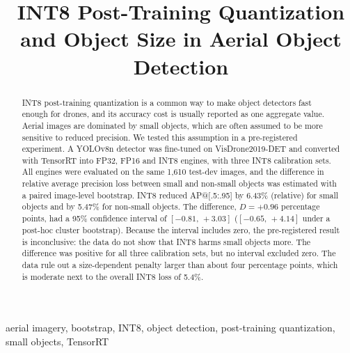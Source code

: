 \documentclass[conference]{IEEEtran}
\begin{document}
\title{INT8 Post-Training Quantization and Object Size in Aerial Object Detection}

\author{
\and
{}
}

\maketitle

\begin{abstract}
INT8 post-training quantization is a common way to make object detectors fast enough for drones,
and its accuracy cost is usually reported as one aggregate value. Aerial images are dominated by
small objects, which are often assumed to be more sensitive to reduced precision. We tested this
assumption in a pre-registered experiment. A YOLOv8n detector was fine-tuned on VisDrone2019-DET
and converted with TensorRT into FP32, FP16 and INT8 engines, with three INT8 calibration sets.
All engines were evaluated on the same 1,610 test-dev images, and the difference in relative
average precision loss between small and non-small objects was estimated with a paired
image-level bootstrap. INT8 reduced AP@[.5:.95] by 6.43\% (relative) for small objects and by
5.47\% for non-small objects. The difference, $D=+0.96$ percentage points, had a 95\% confidence
interval of $[-0.81,\,+3.03]$ ($[-0.65,\,+4.14]$ under a post-hoc cluster bootstrap). Because the
interval includes zero, the
pre-registered result is inconclusive: the data do not show that INT8 harms small objects more.
The difference was positive for all three calibration sets, but no interval excluded zero. The
data rule out a size-dependent penalty larger than about four percentage points, which is moderate
next to the overall INT8 loss of 5.4\%.
\end{abstract}

\begin{IEEEkeywords}
aerial imagery, bootstrap, INT8, object detection, post-training quantization, small objects,
TensorRT
\end{IEEEkeywords}
\end{document}
